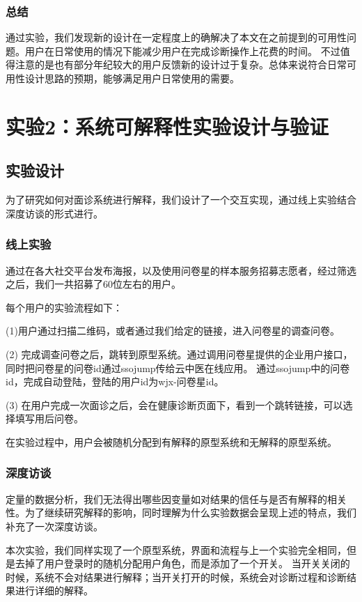 \subsubsection{总结}
通过实验，我们发现新的设计在一定程度上的确解决了本文在之前提到的可用性问题。用户在日常使用的情况下能减少用户在完成诊断操作上花费的时间。
不过值得注意的是也有部分年纪较大的用户反馈新的设计过于复杂。总体来说符合日常可用性设计思路的预期，能够满足用户日常使用的需要。

\section{实验2：系统可解释性实验设计与验证}


\subsection{实验设计}

为了研究如何对面诊系统进行解释，我们设计了一个交互实现，通过线上实验结合深度访谈的形式进行。

\subsubsection{线上实验}
通过在各大社交平台发布海报，以及使用问卷星的样本服务招募志愿者，经过筛选之后，我们一共招募了60位左右的用户。

每个用户的实验流程如下：

(1)用户通过扫描二维码，或者通过我们给定的链接，进入问卷星的调查问卷。

(2) 完成调查问卷之后，跳转到原型系统。通过调用问卷星提供的企业用户接口，同时把问卷星的问卷id通过ssojump传给云中医在线应用。
通过ssojump中的问卷id，完成自动登陆，登陆的用户id为wjx-{问卷星id}。

(3) 在用户完成一次面诊之后，会在健康诊断页面下，看到一个跳转链接，可以选择填写用后问卷。

在实验过程中，用户会被随机分配到有解释的原型系统和无解释的原型系统。

\subsubsection{深度访谈}

定量的数据分析，我们无法得出哪些因变量如对结果的信任与是否有解释的相关性。为了继续研究解释的影响，同时理解为什么实验数据会呈现上述的特点，我们补充了一次深度访谈。

本次实验，我们同样实现了一个原型系统，界面和流程与上一个实验完全相同，但是去掉了用户登录时的随机分配用户角色，而是添加了一个开关。
当开关关闭的时候，系统不会对结果进行解释；当开关打开的时候，系统会对诊断过程和诊断结果进行详细的解释。

